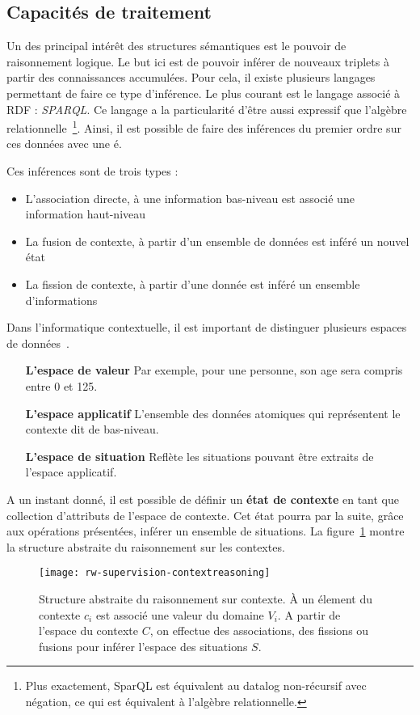 \subsection{Capacités de traitement}
Un des principal intérêt des structures sémantiques est le pouvoir de raisonnement logique. Le but ici est de pouvoir inférer de nouveaux triplets à partir des connaissances accumulées. Pour cela, il existe plusieurs langages permettant de faire ce type d'inférence. Le plus courant est le langage associé à RDF : \textit{SPARQL}. Ce langage a la particularité d'être aussi expressif que l'algèbre relationnelle~\cite{Angles:sparql}\footnote{Plus exactement, SparQL est équivalent au datalog non-récursif avec négation, ce qui est équivalent à l'algèbre relationnelle.}. Ainsi, il est possible de faire des inférences du premier ordre sur ces données avec une é.

Ces inférences sont de trois types :
\begin{itemize}
 \item L'association directe, à une information bas-niveau est associé une information haut-niveau 
 \item La fusion de contexte, à partir d'un ensemble de données est inféré un nouvel état 
 \item La fission de contexte, à partir d'une donnée est inféré un ensemble d'informations
\end{itemize}

Dans l'informatique contextuelle, il est important de distinguer plusieurs espaces de données~\cite{Padovitz:agent}. 
\begin{itemize}
 \item[\textbf{L'espace de valeur}] Par exemple, pour une personne, son age sera compris entre 0 et 125.
 \item[\textbf{L'espace applicatif}] L'ensemble des données atomiques qui représentent le contexte dit de bas-niveau.
 \item[\textbf{L'espace de situation}] Reflète les situations pouvant être extraits de l'espace applicatif.
\end{itemize}

A un instant donné, il est possible de définir un \textbf{état de contexte} en tant que collection d'attributs de l'espace de contexte. Cet état pourra par la suite, grâce aux opérations présentées, inférer un ensemble de situations. La figure~\ref{rw-supervision-contextreasoning} montre la structure abstraite du raisonnement sur les contextes.
\begin{figure}[ht]
    \centering
    \texttt{[image: rw-supervision-contextreasoning]}
    \caption{Structure abstraite du raisonnement sur contexte. À un élement du contexte $c_i$ est associé une valeur du domaine $V_i$. A partir de l'espace du contexte $C$, on effectue des associations, des fissions ou fusions pour inférer l'espace des situations $S$.}\label{rw-supervision-contextreasoning}
\end{figure}

